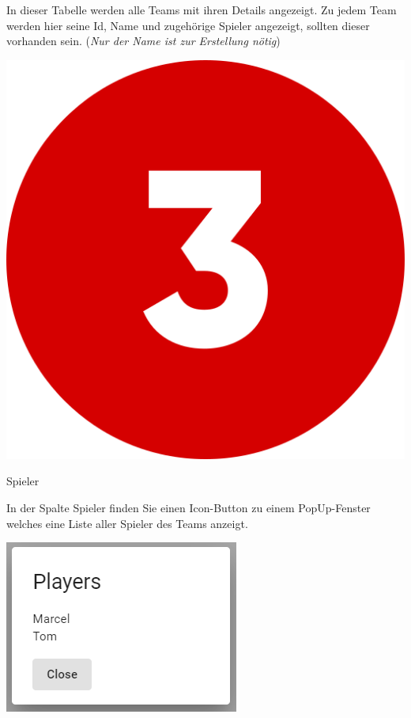 In dieser Tabelle werden alle Teams mit ihren Details angezeigt. Zu jedem Team werden hier seine Id, Name und zugehörige Spieler angezeigt,
sollten dieser vorhanden sein. (\textit{Nur der Name ist zur Erstellung nötig})

\bigskip
\includegraphics[scale=0.05]{pics/user-guide/numbers/number-3.png} \begin{LARGE} Spieler \end{LARGE}

In der Spalte Spieler finden Sie einen Icon-Button zu einem PopUp-Fenster welches eine Liste aller Spieler des Teams anzeigt.

\includegraphics[scale=0.5]{pics/user-guide/teams-player-popup.PNG}

